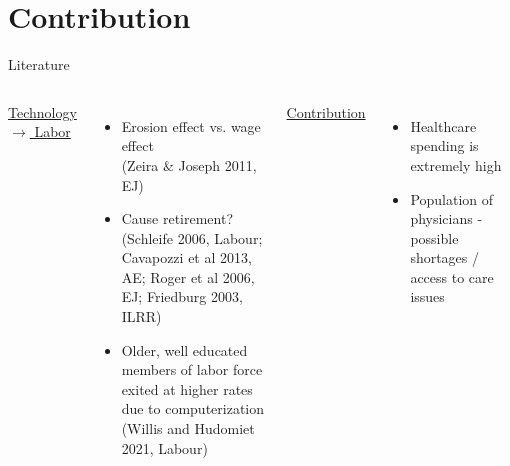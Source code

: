 \documentclass[10pt]{beamer}
\begin{document}
\section{Contribution}

\begin{frame}{Literature}
\small
\begin{columns}
\setlength{\tabcolsep}{-5pt}
        \centering
        \underline{ Technology $\rightarrow$ Labor }
        \vspace{-1mm}
        \begin{itemize}
            \item Erosion effect vs. wage effect \\ \vspace{1mm}
            \tiny (Zeira $\&$ Joseph 2011, EJ)
            
            \footnotesize
            
            \item Cause retirement? \\ \vspace{1mm}
            \tiny (Schleife 2006, Labour; Cavapozzi et al 2013, AE; Roger et al 2006, EJ; Friedburg 2003, ILRR)
            
            \footnotesize
            
            \item Older, well educated members of labor force exited at higher rates due to computerization \\ \vspace{1mm}
            \tiny (Willis and Hudomiet 2021, Labour)
        \end{itemize}
        
        
        \centering
        
        \pause
        
        \color{blue}
        \underline{ Contribution }
        
        \vspace{1mm}
 
            \begin{itemize}
            \color{blue}
                \item Healthcare spending is extremely high
                \item Population of physicians - possible shortages / access to care issues
            \end{itemize}

        
\end{columns}
\end{frame}
\end{document}
